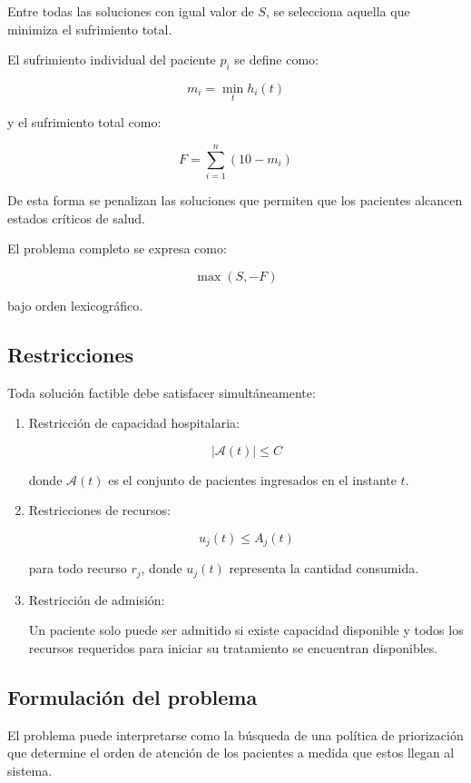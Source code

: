 \documentclass[12pt,a4paper]{article}
\begin{document}
Entre todas las soluciones con igual valor de \(S\), se selecciona aquella que minimiza el sufrimiento total.

El sufrimiento individual del paciente \(p_i\) se define como:

\[
m_i
=
\min_t h_i(t)
\]

y el sufrimiento total como:

\[
F
=
\sum_{i=1}^{n}
(10-m_i)
\]

De esta forma se penalizan las soluciones que permiten que los pacientes alcancen estados críticos de salud.

El problema completo se expresa como:

\[
\max (S,-F)
\]

bajo orden lexicográfico.

\subsection{Restricciones}

Toda solución factible debe satisfacer simultáneamente:

\begin{enumerate}
    \item Restricción de capacidad hospitalaria:

    \[
    |\mathcal{A}(t)| \le C
    \]

    donde \(\mathcal{A}(t)\) es el conjunto de pacientes ingresados en el instante \(t\).

    \item Restricciones de recursos:

    \[
    u_j(t)
    \le
    A_j(t)
    \]

    para todo recurso \(r_j\), donde \(u_j(t)\) representa la cantidad consumida.

    \item Restricción de admisión:

    Un paciente solo puede ser admitido si existe capacidad disponible y todos los recursos requeridos para iniciar su tratamiento se encuentran disponibles.

\end{enumerate}

\subsection{Formulación del problema}

El problema puede interpretarse como la búsqueda de una política de priorización que determine el orden de atención de los pacientes a medida que estos llegan al sistema.
\end{document}
